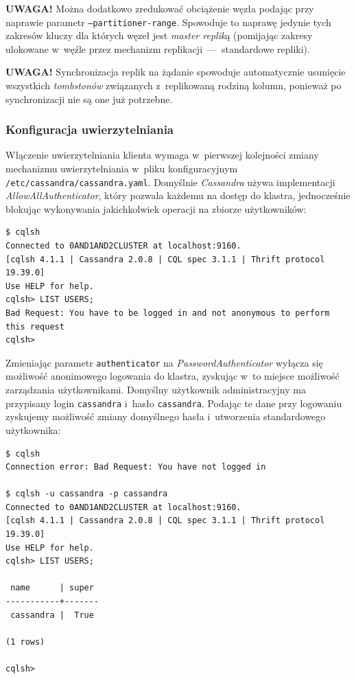 \documentclass{article} %
\begin{document}
\bigskip

\noindent\textbf{UWAGA!} Można dodatkowo zredukować obciążenie węzła podając przy naprawie parametr \texttt{--partitioner-range}.
Spowoduje to naprawę jedynie tych zakresów kluczy dla których węzeł jest \emph{master replik}ą (pomijając zakresy ulokowane w~węźle przez mechanizm replikacji~---~standardowe repliki).

\noindent\textbf{UWAGA!} Synchronizacja replik na żądanie spowoduje automatycznie usunięcie wszystkich \emph{tombstonów} związanych z~replikowaną rodziną kolumn, ponieważ po synchronizacji nie są one już potrzebne.

\pagebreak

\subsubsection{Konfiguracja uwierzytelniania}\label{subsec:cluster_misc_auth}

Włączenie uwierzytelniania klienta wymaga w~pierwszej kolejności zmiany mechanizmu uwierzytelniania w~pliku konfiguracyjnym \texttt{/etc/cassandra/cassandra.yaml}.
Domyślnie \emph{Cassandra} używa implementacji \emph{AllowAllAuthenticator}, który pozwala każdemu na dostęp do klastra, jednocześnie blokując wykonywania jakichkolwiek operacji na zbiorze użytkowników:

\begin{lstlisting}[style=bash, caption={wypisanie listy zdefiniowanych użytkowników przy wyłączonym uwierzytelnianiu}]
$ cqlsh
Connected to 0AND1AND2CLUSTER at localhost:9160.
[cqlsh 4.1.1 | Cassandra 2.0.8 | CQL spec 3.1.1 | Thrift protocol 19.39.0]
Use HELP for help.
cqlsh> LIST USERS;
Bad Request: You have to be logged in and not anonymous to perform this request
cqlsh>
\end{lstlisting}

Zmieniając parametr \texttt{authenticator} na \emph{PasswordAuthenticator} wyłącza się możliwość anonimowego logowania do klastra, zyskując w~to miejsce możliwość zarządzania użytkownikami.
Domyślny użytkownik administracyjny ma przypisany login \texttt{cassandra} i~hasło \texttt{cassandra}.
Podając te dane przy logowaniu zyskujemy możliwość zmiany domyślnego hasła i~utworzenia standardowego użytkownika:

\begin{lstlisting}[style=bash, caption={włączenie uwierzytelniania przy dostępie do klastra przez \texttt{cqlsh}}]
$ cqlsh
Connection error: Bad Request: You have not logged in

$ cqlsh -u cassandra -p cassandra
Connected to 0AND1AND2CLUSTER at localhost:9160.
[cqlsh 4.1.1 | Cassandra 2.0.8 | CQL spec 3.1.1 | Thrift protocol 19.39.0]
Use HELP for help.
cqlsh> LIST USERS;

 name      | super
-----------+-------
 cassandra |  True

(1 rows)

cqlsh>
\end{lstlisting}
\end{document}
